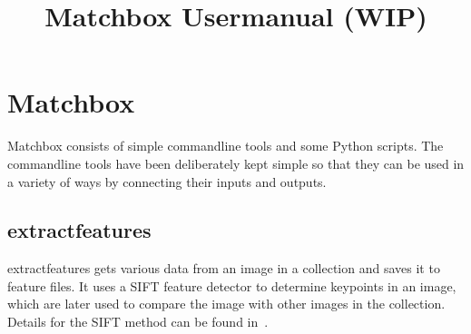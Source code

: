 \documentclass{hitec}
\title{Matchbox Usermanual (WIP)}
\begin{document}
\maketitle

\section{Matchbox}

Matchbox consists of simple commandline tools and some Python scripts.
The commandline tools have been deliberately kept simple so that they 
can be used in a variety of ways by connecting their inputs and outputs.

\subsection{extractfeatures}

{\ttfamily extractfeatures} gets various data from an image in a collection
and saves it to feature files.
It uses a SIFT feature detector to determine keypoints in an image, which are 
later used to compare the image with other images in the collection. Details
for the SIFT method can be found in~\cite{lowe}.
\end{document}
